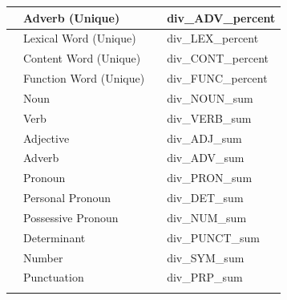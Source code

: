 \documentclass{article}
\begin{document}
\begin{appendices}
\begin{longtable}[c]{| >{\centering\arraybackslash}p{} | >{\centering\arraybackslash}p{} | >{\centering\arraybackslash}p{} | >{\centering\arraybackslash}p{} |}
                                   & Adverb (Unique)                      &                           & div\_ADV\_percent           \\ \cline{2-2} \cline{4-4} 
                                   & Lexical Word (Unique)                &                           & div\_LEX\_percent           \\ \cline{2-2} \cline{4-4} 
                                   & Content Word (Unique)                &                           & div\_CONT\_percent          \\ \cline{2-2} \cline{4-4} 
                                   & Function Word (Unique)               &                           & div\_FUNC\_percent          \\ \hline
\multirow{42}{*}{Quantity}         & Noun                                 & \multirow{18}{*}{Count}   & div\_NOUN\_sum              \\ \cline{2-2} \cline{4-4} 
                                   & Verb                                 &                           & div\_VERB\_sum              \\ \cline{2-2} \cline{4-4} 
                                   & Adjective                            &                           & div\_ADJ\_sum               \\ \cline{2-2} \cline{4-4} 
                                   & Adverb                               &                           & div\_ADV\_sum               \\ \cline{2-2} \cline{4-4} 
                                   & Pronoun                              &                           & div\_PRON\_sum              \\ \cline{2-2} \cline{4-4} 
                                   & Personal Pronoun                     &                           & div\_DET\_sum               \\ \cline{2-2} \cline{4-4} 
                                   & Possessive Pronoun                   &                           & div\_NUM\_sum               \\ \cline{2-2} \cline{4-4} 
                                   & Determinant                          &                           & div\_PUNCT\_sum             \\ \cline{2-2} \cline{4-4} 
                                   & Number                               &                           & div\_SYM\_sum               \\ \cline{2-2} \cline{4-4} 
                                   & Punctuation                          &                           & div\_PRP\_sum               \\ \cline{2-2} \cline{4-4} 

\end{longtable}
\end{appendices}
\end{document}
